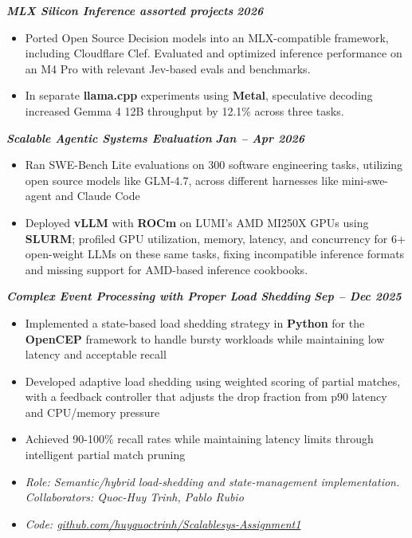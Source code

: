 \documentclass[11pt,a4paper]{article}
\newcommand{\projectheader}[2]{%
    \Needspace{7\baselineskip}%
    \noindent\textbf{\textit{#1}} \hfill \textbf{\textit{#2}}%
}
\begin{document}
\vspace{8pt}

\projectheader{MLX Silicon Inference assorted projects}{2026}
\begin{itemize}
    \item Ported Open Source Decision models into an MLX-compatible framework, including Cloudflare Clef. Evaluated and optimized inference performance on an M4 Pro with relevant Jev-based evals and benchmarks.
    \item In separate \textbf{llama.cpp} experiments using \textbf{Metal}, speculative decoding increased Gemma 4 12B throughput by 12.1\% across three tasks.
\end{itemize}

\vspace{8pt}

\projectheader{Scalable Agentic Systems Evaluation}{Jan -- Apr 2026}
\begin{itemize}
    \item Ran SWE-Bench Lite evaluations on 300 software engineering tasks, utilizing open source models like GLM-4.7, across different harnesses like mini-swe-agent and Claude Code
    \item Deployed \textbf{vLLM} with \textbf{ROCm} on LUMI's AMD MI250X GPUs using \textbf{SLURM}; profiled GPU utilization, memory, latency, and concurrency for 6+ open-weight LLMs on these same tasks, fixing incompatible inference formats and missing support for AMD-based inference cookbooks.
\end{itemize}

\vspace{8pt}

\projectheader{Complex Event Processing with Proper Load Shedding}{Sep -- Dec 2025}
\begin{itemize}
    \item Implemented a state-based load shedding strategy in \textbf{Python} for the \textbf{OpenCEP} framework to handle bursty workloads while maintaining low latency and acceptable recall
    \item Developed adaptive load shedding using weighted scoring of partial matches, with a feedback controller that adjusts the drop fraction from p90 latency and CPU/memory pressure
    \item Achieved 90-100\% recall rates while maintaining latency limits through intelligent partial match pruning
    \item \textit{Role: Semantic/hybrid load-shedding and state-management implementation. Collaborators: Quoc-Huy Trinh, Pablo Rubio}
    \item \textit{Code: \href{https://github.com/huyquoctrinh/Scalablesys-Assignment1}{github.com/huyquoctrinh/Scalablesys-Assignment1}}
\end{itemize}
\end{document}
